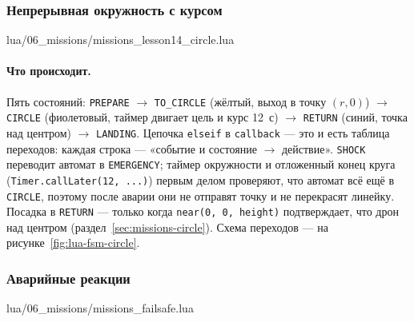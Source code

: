 \subsubsection*{Непрерывная окружность с курсом}

\begin{codefile}{lua/06_missions/missions_lesson14_circle.lua}
\end{codefile}

\paragraph{Что происходит.} Пять состояний: \verb|PREPARE| $\to$ \verb|TO_CIRCLE| (жёлтый, выход в точку $(r, 0)$) $\to$ \verb|CIRCLE| (фиолетовый, таймер двигает цель и курс 12~с) $\to$ \verb|RETURN| (синий, точка над центром) $\to$ \verb|LANDING|. Цепочка \verb|elseif| в \verb|callback| --- это и есть таблица переходов: каждая строка --- «событие и состояние $\to$ действие». \verb|SHOCK| переводит автомат в \verb|EMERGENCY|; таймер окружности и отложенный конец круга (\verb|Timer.callLater(12, ...)|) первым делом проверяют, что автомат всё ещё в \verb|CIRCLE|, поэтому после аварии они не отправят точку и не перекрасят линейку. Посадка в \verb|RETURN| --- только когда \verb|near(0, 0, height)| подтверждает, что дрон над центром (раздел~\ref{sec:missions-circle}). Схема переходов --- на рисунке~\ref{fig:lua-fsm-circle}.



\subsubsection*{Аварийные реакции}

\begin{codefile}{lua/06_missions/missions_failsafe.lua}
\end{codefile}

